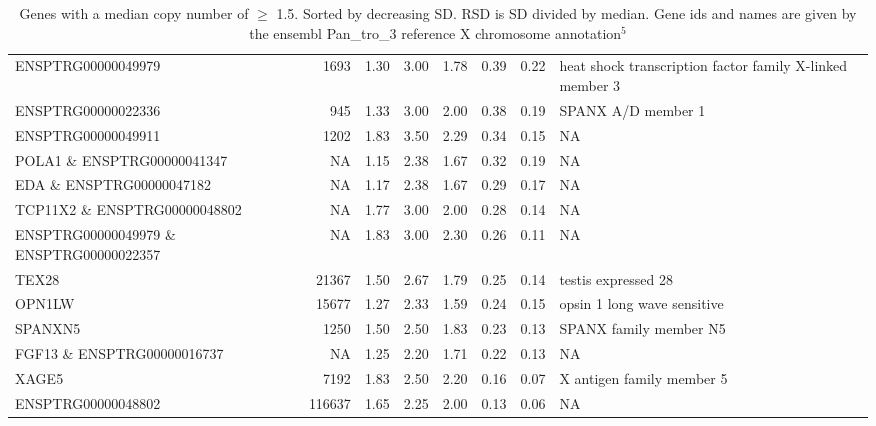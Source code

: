 \begin{table}[h]
\begin{adjustbox}{angle=90}
\begin{tabular}{|l|r|r|r|r|r|r|l|}
ENSPTRG00000049979 & 1693 & 1.30 & 3.00 & 1.78 & 0.39 & 0.22 & heat shock transcription factor family X-linked member 3  \\
ENSPTRG00000022336 & 945 & 1.33 & 3.00 & 2.00 & 0.38 & 0.19 & SPANX A/D member 1  \\
ENSPTRG00000049911 & 1202 & 1.83 & 3.50 & 2.29 & 0.34 & 0.15 & NA \\
POLA1 \& ENSPTRG00000041347 & NA & 1.15 & 2.38 & 1.67 & 0.32 & 0.19 & NA \\
EDA \& ENSPTRG00000047182 & NA & 1.17 & 2.38 & 1.67 & 0.29 & 0.17 & NA \\
TCP11X2 \& ENSPTRG00000048802 & NA & 1.77 & 3.00 & 2.00 & 0.28 & 0.14 & NA \\
ENSPTRG00000049979 \& ENSPTRG00000022357 & NA & 1.83 & 3.00 & 2.30 & 0.26 & 0.11 & NA \\
TEX28 & 21367 & 1.50 & 2.67 & 1.79 & 0.25 & 0.14 & testis expressed 28  \\
OPN1LW & 15677 & 1.27 & 2.33 & 1.59 & 0.24 & 0.15 & opsin 1 long wave sensitive  \\
SPANXN5 & 1250 & 1.50 & 2.50 & 1.83 & 0.23 & 0.13 & SPANX family member N5  \\
FGF13 \& ENSPTRG00000016737 & NA & 1.25 & 2.20 & 1.71 & 0.22 & 0.13 & NA \\
XAGE5 & 7192 & 1.83 & 2.50 & 2.20 & 0.16 & 0.07 & X antigen family member 5  \\
ENSPTRG00000048802 & 116637 & 1.65 & 2.25 & 2.00 & 0.13 & 0.06 & NA \\


\hline

\end{tabular}
\end{adjustbox}
\caption{\label{tab:genes}Genes with a median copy number of $\geq$ 1.5. Sorted by decreasing SD. RSD is SD divided by median. Gene ids and names are given by the ensembl Pan\_tro\_3 reference X chromosome annotation$^5$}
\end{table}


